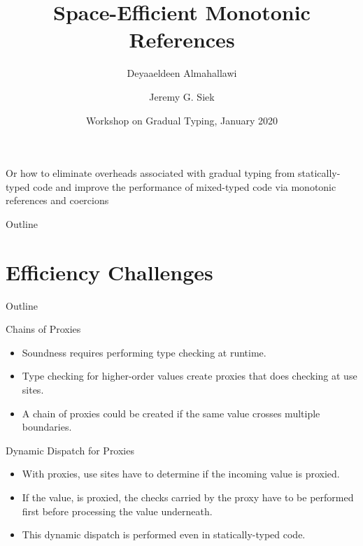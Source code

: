\documentclass[12pt,dvipsnames]{beamer}
\title %
{Space-Efficient Monotonic References}
\author[Almahallawi, Siek] %
{Deyaaeldeen Almahallawi\inst{1} \and Jeremy G. Siek\inst{1}}
\institute[IU] %
{
  \inst{1}%
  Luddy School of Informatics, Computing, and Engineering\\
  Indiana University Bloomington
}
\date[WGT 2020] %
{Workshop on Gradual Typing, January 2020}
\begin{document}
\begin{frame}
\maketitle
\end{frame}

\begin{frame}
  \begin{center}
    Or how to eliminate overheads associated with gradual typing from
    statically-typed code \pause and improve the performance of mixed-typed
    code via monotonic references and coercions
  \end{center}
\end{frame}

\begin{frame}{Outline}
\tableofcontents
\end{frame}

\section{Efficiency Challenges}

\begin{frame}{Outline}
  \tableofcontents[currentsection]
\end{frame}

\begin{frame}[fragile]{Chains of Proxies}
  \begin{itemize}
  \item Soundness requires performing type checking at runtime.
  \item Type checking for higher-order values create proxies that does
    checking at use sites.
  \item A chain of proxies could be created if the same value crosses
    multiple boundaries.
  \end{itemize}
\end{frame}

\begin{frame}[fragile]{Dynamic Dispatch for Proxies}
  \begin{itemize}
  \item With proxies, use sites have to determine if the incoming value
    is proxied.
  \item If the value, is proxied, the checks carried by the proxy have
    to be performed first before processing the value underneath.
  \item This dynamic dispatch is performed even in statically-typed code.
  \end{itemize}
\end{frame}
\end{document}
